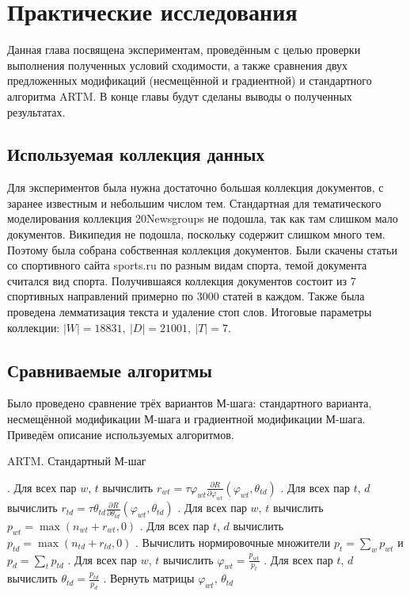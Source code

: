 \documentclass[12pt]{article}
\newenvironment{rusalgorithm}[1][htb]
  {\renewcommand{\algorithmcfname}{Алгоритм}
   \begin{algorithm}[#1]
  }{\end{algorithm}}
\renewcommand{\phi}{\varphi}
\begin{document}
	\section{Практические исследования}
Данная глава посвящена экспериментам, проведённым с целью проверки выполнения полученных условий сходимости, а также сравнения двух предложенных модификаций (несмещённой и градиентной) и стандартного алгоритма ARTM. В конце  главы будут сделаны выводы о полученных результатах.
\subsection{Используемая коллекция данных}
Для экспериментов была нужна достаточно большая коллекция документов, с заранее известным  и небольшим числом тем. Стандартная для тематического моделирования  коллекция 20Newsgroups не подошла, так как там слишком мало документов. Википедия не подошла, поскольку содержит слишком много тем. Поэтому была собрана собственная коллекция документов. Были скачены статьи со спортивного сайта sports.ru по разным видам спорта, темой документа считался вид спорта. Получившаяся коллекция документов состоит из 7 спортивных направлений примерно по 3000 статей в каждом. Также была проведена лемматизация текста и удаление стоп слов. Итоговые параметры коллекции: $|W| = 18831,~|D| = 21001,~|T| = 7$.
	\subsection{Сравниваемые алгоритмы}
Было проведено сравнение трёх вариантов М-шага: стандартного варианта, несмещённой модификации М-шага и градиентной модификации М-шага. Приведём описание используемых алгоритмов.

\begin{rusalgorithm}[H]
\caption{ARTM. Стандартный М-шаг}\label{malgo1}
\begin{algorithmic}[]
\Procedure{MStep}{$n_{wt}$, $n_{td}$, $\phi_{wt}$, $\theta_{td}$}
. Для всех пар $w$, $t$ вычислить $r_{wt} = \tau \phi_{wt} \frac{\partial{R}}{\partial{\phi_{wt}}}(\phi_{wt}, \theta_{td})$
. Для всех пар $t$, $d$ вычислить $r_{td} =\tau  \theta_{td} \frac{\partial{R}}{\partial{\theta_{td}}}(\phi_{wt}, \theta_{td})$
. Для всех пар $w$, $t$ вычислить $p_{wt} = \max(n_{wt} + r_{wt}, 0)$
. Для всех пар $t$, $d$ вычислить $p_{td} = \max(n_{td} + r_{td}, 0)$
. Вычислить нормировочные множители $p_t = \sum_w p_{wt}$ и $p_d = \sum_t p_{td}$
. Для всех пар $w$, $t$ вычислить $\phi_{wt} = \frac{p_{wt}}{p_t}$
. Для всех пар $t$, $d$ вычислить $\theta_{td} = \frac{p_{td}}{p_d}$
. Вернуть матрицы $\phi_{wt}$, $\theta_{td}$
\EndProcedure
\end{algorithmic}
\end{rusalgorithm}
\newpage
\end{document}
